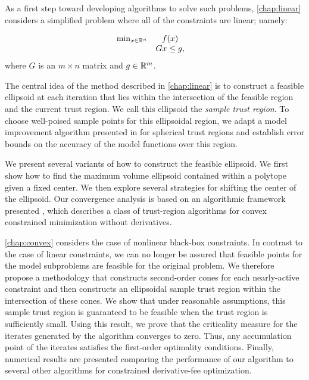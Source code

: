 As a first step toward developing algorithms to solve such problems,  \cref{chap:linear}  considers a simplified problem where all of the constraints are linear; namely:

\begin{equation} 
\begin{array}{ccl} \min_{x \in \mathbb R^n} & f(x) \\
& Gx \le g, & 
\end{array}
\end{equation}
where $G$ is an $m \times n$ matrix and $g \in \mathbb R^m$.

The central idea of the method described in \cref{chap:linear}  is to construct a feasible ellipsoid at each iteration that lies within the intersection of the feasible region and the current trust region.   We call this ellipsoid the {\em sample trust region}.    To choose well-poised sample points for this ellipsoidal region,  we adapt a model improvement algorithm presented in \cite{introduction_book} for spherical trust regions and establish error bounds on the accuracy of the model functions over this region.   


We present several variants of how to construct the feasible ellipsoid.   We first show how to find the maximum volume ellipsoid contained within a polytope given a fixed center.   We then explore several strategies for shifting the center of the ellipsoid.    
Our convergence analysis is based on an algorithmic framework presented \cite{conejo.karas.ea:global}, which describes a class of trust-region algorithms for convex constrained minimization without derivatives. 


\cref{chap:convex} considers the case of nonlinear black-box constraints.    In contrast to the case of linear constraints, we can no longer be assured that feasible points for the model subproblems are feasible for the original problem.   We therefore propose a methodology that constructs second-order cones for each nearly-active constraint and then constructs an ellipsoidal sample trust region within the intersection of these cones.   We show that under reasonable assumptions, this sample trust region is guaranteed to be feasible when the trust region is sufficiently small.     Using this result,  we prove that the criticality measure for the iterates generated by the algorithm converges to zero.   Thus,  any accumulation point of the iterates satisfies the first-order optimality conditions.    Finally, numerical results are presented comparing the performance of our algorithm to several other algorithms for constrained derivative-fee optimization.


